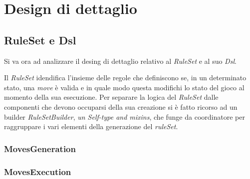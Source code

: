 \section{Design di dettaglio}



\subsection{RuleSet e Dsl}

Si va ora ad analizzare il desing di dettaglio relativo al \textit{RuleSet} e al suo \textit{Dsl}.

Il \textit{RuleSet} idendifica l'insieme delle regole che definiscono se, in un determinato stato, una \textit{move} è valida e in quale modo questa modifichi lo stato del gioco al momento della sua esecuzione.
Per separare la logica del \textit{RuleSet} dalle componenti che devono occuparsi della sua creazione si è fatto ricorso ad un builder \textit{RuleSetBuilder}, \textit{un Self-type and mixins}, che funge da coordinatore per raggruppare i vari elementi della generazione del \textit{ruleSet}.

\subsubsection{MovesGeneration}

\subsubsection{MovesExecution}

